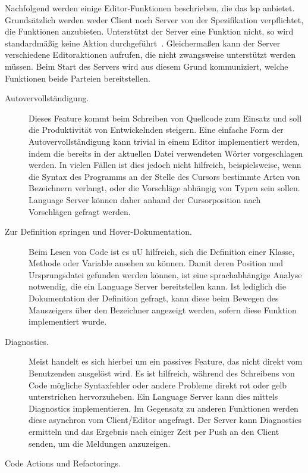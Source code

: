 Nachfolgend werden einige Editor-Funktionen beschrieben, die das \ac{lsp} anbietet.
Grundsätzlich werden weder Client noch Server von der Spezifikation verpflichtet, die Funktionen anzubieten.
Unterstützt der Server eine Funktion nicht, so wird standardmäßig keine Aktion durchgeführt~\cite{lsp-overview}.
Gleichermaßen kann der Server verschiedene Editoraktionen aufrufen, die nicht zwangsweise unterstützt werden müssen.
Beim Start des Servers wird aus diesem Grund kommuniziert, welche Funktionen beide Parteien bereitstellen.\cite[Initialize Request]{lsp-spec}

\begin{description}
    \item[Autovervollständigung.]
    Dieses Feature kommt beim Schreiben von Quellcode zum Einsatz und soll die Produktivität von Entwickelnden steigern.
    Eine einfache Form der Autovervollständigung kann trivial in einem Editor implementiert werden, indem die bereits in der aktuellen Datei verwendeten Wörter vorgeschlagen werden.
    In vielen Fällen ist dies jedoch nicht hilfreich, beispielsweise, wenn die Syntax des Programms an der Stelle des Cursors bestimmte Arten von Bezeichnern verlangt, oder die Vorschläge abhängig von Typen sein sollen.
    Language Server können daher anhand der Cursorposition nach Vorschlägen gefragt werden.
    \item[Zur Definition springen und Hover-Dokumentation.]
    Beim Lesen von Code ist es \ac{uU} hilfreich, sich die Definition einer Klasse, Methode oder Variable ansehen zu können.
    Damit deren Position und Ursprungsdatei gefunden werden können, ist eine sprachabhängige Analyse notwendig, die ein Language Server bereitstellen kann.
    Ist lediglich die Dokumentation der Definition gefragt, kann diese beim Bewegen des Mauszeigers über den Bezeichner angezeigt werden, sofern diese Funktion implementiert wurde.
    \item[Diagnostics.]
    Meist handelt es sich hierbei um ein passives Feature, das nicht direkt vom Benutzenden ausgelöst wird.
    Es ist hilfreich, während des Schreibens von Code mögliche Syntaxfehler oder andere Probleme direkt rot oder gelb unterstrichen hervorzuheben.
    Ein Language Server kann dies mittels Diagnostics implementieren.
    Im Gegensatz zu anderen Funktionen werden diese asynchron vom Client/Editor angefragt.
    Der Server kann Diagnostics ermitteln und das Ergebnis nach einiger Zeit per Push an den Client senden, um die Meldungen anzuzeigen.
    \item[Code Actions und Refactorings.]

\end{description}
